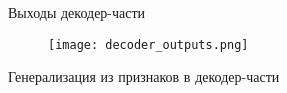 
\begin{frame}{Выходы декодер-части}
\begin{figure}
\centering
\texttt{[image: decoder\_outputs.png]}
\end{figure}
    Генерализация из признаков в декодер-части
\end{frame}